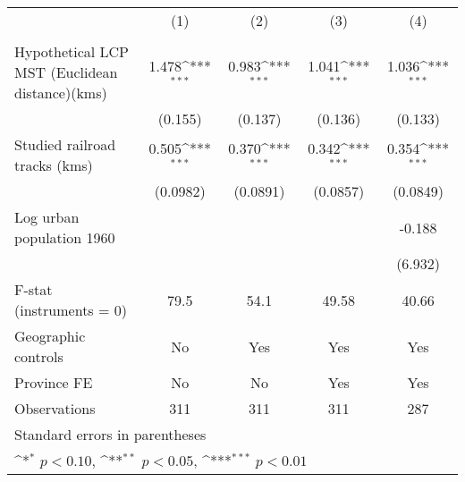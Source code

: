 {
\def\sym#1{\ifmmode^{#1}\else\(^{#1}\)\fi}
\begin{tabular}{l*{4}{c}}
\hline\hline
                &\multicolumn{1}{c}{(1)}&\multicolumn{1}{c}{(2)}&\multicolumn{1}{c}{(3)}&\multicolumn{1}{c}{(4)}\\
                &\multicolumn{1}{c}{}&\multicolumn{1}{c}{}&\multicolumn{1}{c}{}&\multicolumn{1}{c}{}\\
\hline
Hypothetical LCP MST (Euclidean distance)(kms)&    1.478\sym{***}&    0.983\sym{***}&    1.041\sym{***}&    1.036\sym{***}\\
                &  (0.155)         &  (0.137)         &  (0.136)         &  (0.133)         \\
[1em]
Studied railroad tracks (kms)&    0.505\sym{***}&    0.370\sym{***}&    0.342\sym{***}&    0.354\sym{***}\\
                & (0.0982)         & (0.0891)         & (0.0857)         & (0.0849)         \\
[1em]
Log urban population 1960&                  &                  &                  &   -0.188         \\
                &                  &                  &                  &  (6.932)         \\
\hline
F-stat (instruments = 0)&     79.5         &     54.1         &    49.58         &    40.66         \\
Geographic controls&       No         &      Yes         &      Yes         &      Yes         \\
Province FE     &       No         &       No         &      Yes         &      Yes         \\
Observations    &      311         &      311         &      311         &      287         \\
\hline\hline
\multicolumn{5}{l}{\footnotesize Standard errors in parentheses}\\
\multicolumn{5}{l}{\footnotesize \sym{*} \(p<0.10\), \sym{**} \(p<0.05\), \sym{***} \(p<0.01\)}\\
\end{tabular}
}
